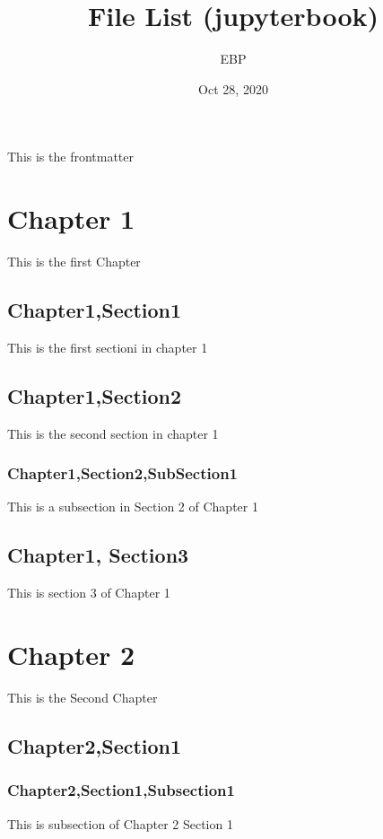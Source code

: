 \documentclass[letterpaper,10pt,english]{sphinxmanual}
\title{File List (jupyterbook)}
\date{Oct 28, 2020}
\author{EBP}
\begin{document}
\pagestyle{empty}
\sphinxmaketitle
\pagestyle{plain}
\sphinxtableofcontents
\pagestyle{normal}
\label{\detokenize{intro::doc}}


This is the frontmatter

\label{\detokenize{intro:globaltoc}}

\chapter{Chapter 1}
\label{\detokenize{chapter1:chapter-1}}\label{\detokenize{chapter1::doc}}
This is the first Chapter


\section{Chapter1,Section1}
\label{\detokenize{chapter1:chapter1-section1}}
This is the first sectioni in chapter 1


\section{Chapter1,Section2}
\label{\detokenize{chapter1:chapter1-section2}}
This is the second section in chapter 1


\subsection{Chapter1,Section2,SubSection1}
\label{\detokenize{chapter1:chapter1-section2-subsection1}}
This is a subsection in Section 2 of Chapter 1


\section{Chapter1, Section3}
\label{\detokenize{chapter1:chapter1-section3}}
This is section 3 of Chapter 1


\chapter{Chapter 2}
\label{\detokenize{chapter2:chapter-2}}\label{\detokenize{chapter2::doc}}
This is the Second Chapter


\section{Chapter2,Section1}
\label{\detokenize{chapter2:chapter2-section1}}

\subsection{Chapter2,Section1,Subsection1}
\label{\detokenize{chapter2:chapter2-section1-subsection1}}
This is subsection of Chapter 2 Section 1
\end{document}

